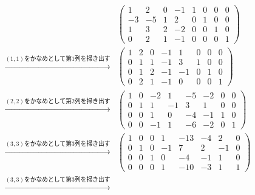 \begin{tanswer}
  \begin{align*}
                                                  &
    \left(
    \begin{array}{cccc|cccc}
        1  & 2  & 0 & -1 & 1 & 0 & 0 & 0 \\
        -3 & -5 & 1 & 2  & 0 & 1 & 0 & 0 \\
        1  & 3  & 2 & -2 & 0 & 0 & 1 & 0 \\
        0  & 2  & 1 & -1 & 0 & 0 & 0 & 1
      \end{array}
    \right)                                         \\
    \xrightarrow{\text{$(1,1)$をかなめとして第$1$列を掃き出す}} &
    \left( \begin{array}{cccc|cccc}
               1 & 2 & 0 & -1 & 1  & 0 & 0 & 0 \\
               0 & 1 & 1 & -1 & 3  & 1 & 0 & 0 \\
               0 & 1 & 2 & -1 & -1 & 0 & 1 & 0 \\
               0 & 2 & 1 & -1 & 0  & 0 & 0 & 1
             \end{array}
    \right)                                         \\
    \xrightarrow{\text{$(2,2)$をかなめとして第$2$列を掃き出す}} &
    \left( \begin{array}{cccc|cccc}
               1 & 0 & -2 & 1  & -5 & -2 & 0 & 0 \\
               0 & 1 & 1  & -1 & 3  & 1  & 0 & 0 \\
               0 & 0 & 1  & 0  & -4 & -1 & 1 & 0 \\
               0 & 0 & -1 & 1  & -6 & -2 & 0 & 1
             \end{array}
    \right)                                         \\
    \xrightarrow{\text{$(3,3)$をかなめとして第$3$列を掃き出す}} &
    \left( \begin{array}{cccc|cccc}
               1 & 0 & 0 & 1  & -13 & -4 & 2  & 0 \\
               0 & 1 & 0 & -1 & 7   & 2  & -1 & 0 \\
               0 & 0 & 1 & 0  & -4  & -1 & 1  & 0 \\
               0 & 0 & 0 & 1  & -10 & -3 & 1  & 1
             \end{array}
    \right)                                         \\
    \xrightarrow{\text{$(3,3)$をかなめとして第$3$列を掃き出す}} &

\end{align*}
\end{tanswer}
